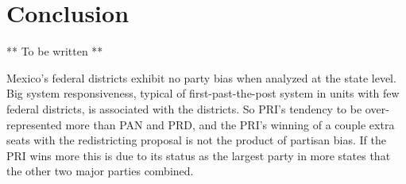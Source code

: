 \documentclass[letter,12pt]{article}
\begin{document}




\section{Conclusion}

** To be written **

Mexico's federal districts exhibit no party bias when analyzed at the state level. Big system responsiveness, typical of first-past-the-post system in units with few federal districts, is associated with the districts. So PRI's tendency to be over-represented more than PAN and PRD, and the PRI's winning of a couple extra seats with the redistricting proposal is not the product of partisan bias. If the PRI wins more this is due to its status as the largest party in more states that the other two major parties combined. 
\end{document}
